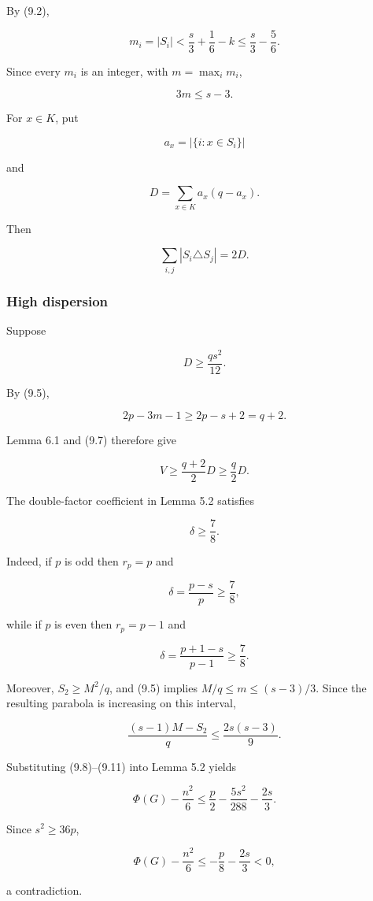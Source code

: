 \documentclass[
  american,
  11pt,
  a4paper,
]{article}
\begin{document}
By (9.2),

\[
m_i=|S_i|
<
\frac s3+\frac16-k
\le
\frac s3-\frac56.
\]

Since every \(m_i\) is an integer, with \(m=\max_i m_i\),

\[
\boxed{3m\le s-3.}
\tag{9.5}
\]

For \(x\in K\), put

\[
a_x=|\{i:x\in S_i\}|
\]

and

\[
D=\sum_{x\in K}a_x(q-a_x).
\tag{9.6}
\]

Then

\[
\sum_{i,j}|S_i\triangle S_j|=2D.
\tag{9.7}
\]

\subsubsection{High dispersion}\label{high-dispersion}

Suppose

\[
D\ge\frac{qs^2}{12}.
\tag{9.8}
\]

By (9.5),

\[
2p-3m-1\ge2p-s+2=q+2.
\]

Lemma 6.1 and (9.7) therefore give

\[
V
\ge
\frac{q+2}{2}D
\ge
\frac q2D.
\tag{9.9}
\]

The double-factor coefficient in Lemma 5.2 satisfies

\[
\boxed{\delta\ge\frac78.}
\tag{9.10}
\]

Indeed, if \(p\) is odd then \(r_p=p\) and

\[
\delta=\frac{p-s}{p}\ge\frac78,
\]

while if \(p\) is even then \(r_p=p-1\) and

\[
\delta=\frac{p+1-s}{p-1}\ge\frac78.
\]

Moreover, \(S_2\ge M^2/q\), and (9.5) implies \(M/q\le m\le(s-3)/3\). Since the resulting parabola is increasing on this interval,

\[
\frac{(s-1)M-S_2}{q}
\le
\frac{2s(s-3)}9.
\tag{9.11}
\]

Substituting (9.8)--(9.11) into Lemma 5.2 yields

\[
\Phi(G)-\frac{n^2}{6}
\le
\frac p2-\frac{5s^2}{288}-\frac{2s}{3}.
\tag{9.12}
\]

Since \(s^2\ge36p\),

\[
\Phi(G)-\frac{n^2}{6}
\le
-\frac p8-\frac{2s}{3}<0,
\]

a contradiction.
\end{document}
